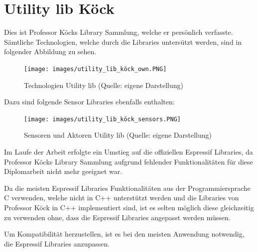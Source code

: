 \pagebreak

\section{Utility lib Köck}\label{sec:utility-lib-koeck}
Dies ist Professor Köcks Library Sammlung, welche er persönlich verfasste. Sämtliche Technologien, welche durch die Libraries untersützt werden, sind in folgender Abbildung zu sehen.

\begin{figure}[H]
    \begin{center}
        \texttt{[image: images/utility\_lib\_köck\_own.PNG]}
        \caption{Technologien Utility lib (Quelle: eigene Darstellung)}
    \end{center}
\end{figure}

\pagebreak
Dazu sind folgende Sensor Libraries ebenfalls enthalten:

\begin{figure}[H]
    \begin{center}
        \texttt{[image: images/utility\_lib\_köck\_sensors.PNG]}
        \caption{Sensoren und Aktoren Utility lib (Quelle: eigene Darstellung)}
    \end{center}
\end{figure}

Im Laufe der Arbeit erfolgte ein Umstieg auf die offiziellen Espressif Libraries, da Professor Köcks Library Sammlung aufgrund fehlender Funktionalitäten für diese Diplomarbeit nicht mehr geeignet war.

Da die meisten Espressif Libraries Funktionalitäten aus der Programmiersprache C verwenden, welche nicht in C++ unterstützt werden und die Libraries von Professor Köck in C++ implementiert sind, ist es selten möglich diese gleichzeitig zu verwenden ohne, dass die Espressif Libraries angepasst werden müssen.

Um Kompatibilität herzustellen, ist es bei den meisten Anwendung notwendig, die Espressif Libraries anzupassen.